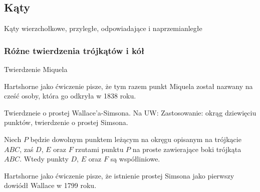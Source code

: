 \subsection{Kąty}
Kąty wierzchołkowe, przyległe, odpowiadające i naprzemianległe
\loremipsum







\subsubsection{Różne twierdzenia trójkątów i kół}
Twierdzenie Miquela
\loremipsum
{} %

Hartshorne jako ćwiczenie \cite[s. 61]{hartshorne2000} pisze, że tym razem punkt Miquela został nazwany na cześć osoby, która go odkryła w 1838 roku.

Twierdzneie o prostej Wallace'a-Simsona.
Na UW: Zastosowanie: okrąg dziewięciu punktów, twierdzenie o prostej Simsona.

\begin{proposition}
	Niech $P$ będzie dowolnym punktem leżącym na okręgu opisanym na trójkącie $ABC$, zaś $D$, $E$ oraz $F$ rzutami punktu $P$ na proste zawierające boki trójkąta $ABC$.
	Wtedy punkty $D$, $E$ oraz $F$ są współliniowe.
\end{proposition}

Hartshorne jako ćwiczenie \cite[s. 61]{hartshorne2000} pisze, że istnienie prostej Simsona jako pierwszy dowiódł Wallace w 1799 roku.